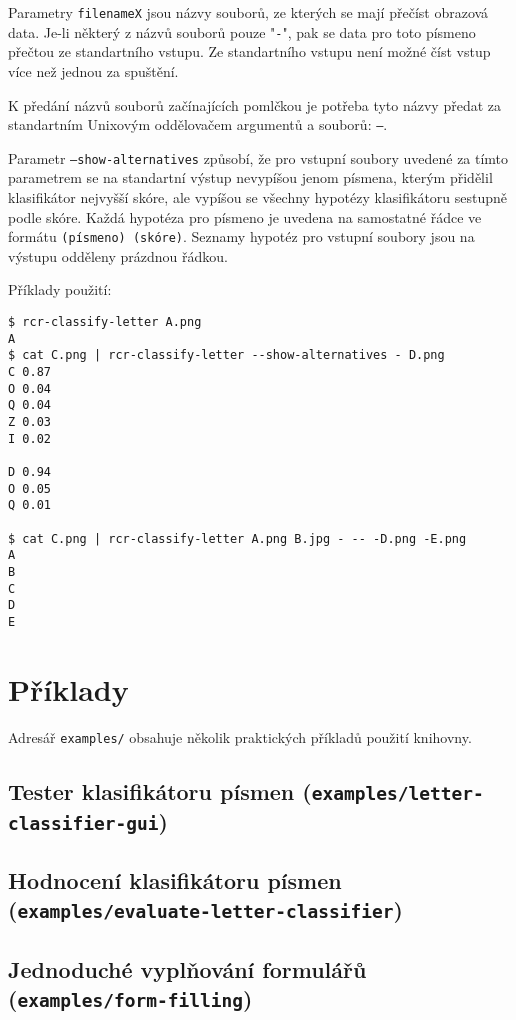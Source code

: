 \documentclass[a4paper]{article}
\begin{document}
Parametry \texttt{filenameX} jsou názvy souborů, ze kterých se mají přečíst
obrazová data. Je-li některý z názvů souborů pouze "\texttt{-}", pak se data
pro toto písmeno přečtou ze standartního vstupu. Ze standartního vstupu
není možné číst vstup více než jednou za spuštění.

K předání názvů souborů začínajících pomlčkou je potřeba tyto názvy předat
za standartním Unixovým oddělovačem argumentů a souborů: \texttt{--}.

Parametr \texttt{--show-alternatives} způsobí, že pro vstupní soubory
uvedené za tímto parametrem se na standartní výstup nevypíšou jenom
písmena, kterým přidělil klasifikátor nejvyšší skóre, ale vypíšou se
všechny hypotézy klasifikátoru sestupně podle skóre. Každá hypotéza
pro písmeno je uvedena na samostatné řádce ve formátu \texttt{(písmeno)
(skóre)}. Seznamy hypotéz pro vstupní soubory jsou na výstupu odděleny prázdnou
řádkou.

Příklady použití:
\begin{lstlisting}
$ rcr-classify-letter A.png
A
$ cat C.png | rcr-classify-letter --show-alternatives - D.png
C 0.87
O 0.04
Q 0.04
Z 0.03
I 0.02

D 0.94
O 0.05
Q 0.01

$ cat C.png | rcr-classify-letter A.png B.jpg - -- -D.png -E.png
A
B
C
D
E
\end{lstlisting}

\section{Příklady}
Adresář \texttt{examples/} obsahuje několik praktických příkladů použití knihovny.

\subsection{Tester klasifikátoru písmen (\texttt{examples/letter-classifier-gui})}

\subsection{Hodnocení klasifikátoru písmen (\texttt{examples/evaluate-letter-classifier})}

\subsection{Jednoduché vyplňování formulářů (\texttt{examples/form-filling})}
\end{document}
